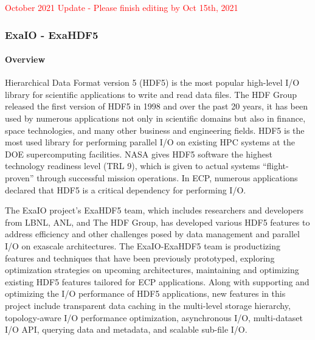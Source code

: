 \noindent
\textcolor{red}{October 2021 Update - Please finish editing by Oct 15th, 2021}

\subsubsection{ ExaIO - ExaHDF5}
\label{subsubsect:exahdf5}

\paragraph{Overview} 
Hierarchical Data Format version 5 (HDF5) is the most popular high-level I/O library for scientific applications to write and read data files.
The HDF Group released the first version of HDF5 in 1998 and over the past 20 years, it has been used by numerous applications not only in scientific domains but also in finance, space technologies, and many other business and engineering fields. HDF5 is the most used library for performing parallel I/O on existing HPC systems at the DOE supercomputing facilities. NASA gives HDF5 software the highest technology readiness level (TRL 9), which is given to actual systems ``flight-proven'' through successful mission operations. In ECP, numerous applications declared that HDF5 is a critical dependency for performing I/O.

The ExaIO project's ExaHDF5 team, which includes researchers and developers from LBNL, ANL, and The HDF Group, has developed various HDF5 features to address efficiency and other challenges posed by data management and parallel I/O on exascale architectures. The ExaIO-ExaHDF5 team is productizing features and techniques that have been previously prototyped, exploring optimization strategies on upcoming architectures, maintaining and optimizing existing HDF5 features tailored for ECP applications. Along with supporting and optimizing the I/O performance of HDF5 applications, new features in this project include transparent data caching in the multi-level storage hierarchy, topology-aware I/O performance optimization, asynchronous I/O, multi-dataset I/O API, querying data and metadata, and scalable sub-file I/O. 

